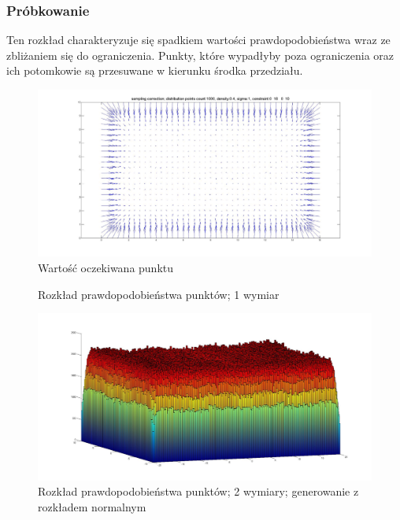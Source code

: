 \documentclass{mini}
\begin{document}
\subsubsection*{Próbkowanie}
Ten rozkład charakteryzuje się spadkiem wartości prawdopodobieństwa wraz ze zbliżaniem się do ograniczenia. Punkty, które wypadłyby poza ograniczenia oraz ich potomkowie są przesuwane w kierunku środka przedziału.

\begin{figure}[H]
\centering
\includegraphics[width=\textwidth]{sampling2dprzesuniecie}
\caption{Wartość oczekiwana punktu}
\end{figure}

\begin{figure}[H]
\centering
{}
\quad
{}
\caption{Rozkład prawdopodobieństwa punktów; 1 wymiar}
\end{figure}

\begin{figure}[H]
\centering
\includegraphics[width=\textwidth]{s_n_10M_2__20_20__10_10_4_2}
\caption{Rozkład prawdopodobieństwa punktów; 2 wymiary; generowanie z rozkładem normalnym}
\end{figure}
\end{document}
